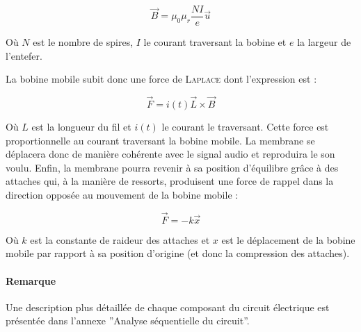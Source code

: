 $$\vec{B} = \mu_0\mu_r\frac{NI}{e}\vec{u}$$

Où $N$ est le nombre de spires, $I$ le courant traversant la bobine et $e$ la largeur de 
l'entefer.

La bobine mobile subit donc une force de \textsc{Laplace} dont l'expression est :

$$\vec{F} = i(t)\vec{L}\times{\vec{B}}$$ 

Où $L$ est la longueur du fil et $i(t)$ le courant le traversant. Cette force est proportionnelle
au courant traversant
la bobine mobile. La membrane se déplacera donc de manière cohérente avec le signal audio
et reproduira le son voulu. Enfin, la membrane pourra revenir à sa position d'équilibre
grâce à des attaches qui, à la manière de ressorts, produisent une force de rappel dans la
direction opposée au mouvement de la bobine mobile :

$$\vec{F} = -k \vec{x}$$ %

Où $k$ est la constante de raideur des attaches et $x$ est le déplacement de la bobine mobile
par rapport à sa position d'origine (et donc la compression des attaches).

\paragraph{Remarque}
Une description plus détaillée de chaque composant du circuit électrique est présentée
dans l'annexe ''Analyse séquentielle du circuit''.


